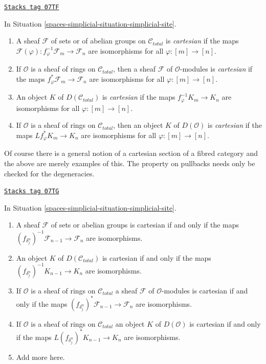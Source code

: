 \begin{definition}
\label{spaces-simplicial-definition-cartesian-sheaf}
\href{https://stacks.math.columbia.edu/tag/07TF}{\texttt{Stacks tag 07TF}}

In Situation \ref{spaces-simplicial-situation-simplicial-site}.
\begin{enumerate}
\item A sheaf $\mathcal{F}$ of sets or of abelian groups on
$\mathcal{C}_{total}$ is {\it cartesian} if the maps
$\mathcal{F}(\varphi) : f_\varphi^{-1}\mathcal{F}_m \to \mathcal{F}_n$
are isomorphisms for all $\varphi : [m] \to [n]$.
\item If $\mathcal{O}$ is a sheaf of rings on $\mathcal{C}_{total}$,
then a sheaf $\mathcal{F}$ of $\mathcal{O}$-modules is
{\it cartesian} if  the maps $f_\varphi^*\mathcal{F}_m \to \mathcal{F}_n$
are isomorphisms for all $\varphi : [m] \to [n]$.
\item An object $K$ of $D(\mathcal{C}_{total})$ is {\it cartesian} if the maps
$f_\varphi^{-1}K_m \to K_n$
are isomorphisms for all $\varphi : [m] \to [n]$.
\item If $\mathcal{O}$ is a sheaf of rings on $\mathcal{C}_{total}$, then
an object $K$ of $D(\mathcal{O})$ is {\it cartesian} if the maps
$Lf_\varphi^*K_m \to K_n$
are isomorphisms for all $\varphi : [m] \to [n]$.
\end{enumerate}
\end{definition}

Of course there is a general notion of a cartesian section of a
fibred category and the above are merely examples of this.
The property on pullbacks needs only be checked for the degeneracies.

\begin{lemma}
\label{spaces-simplicial-lemma-check-cartesian-module}
\href{https://stacks.math.columbia.edu/tag/07TG}{\texttt{Stacks tag 07TG}}

In Situation \ref{spaces-simplicial-situation-simplicial-site}.
\begin{enumerate}
\item A sheaf $\mathcal{F}$ of sets or abelian groups is cartesian
if and only if the maps
$(f_{\delta^n_j})^{-1}\mathcal{F}_{n - 1} \to \mathcal{F}_n$
are isomorphisms.
\item An object $K$ of $D(\mathcal{C}_{total})$ is cartesian
if and only if the maps
$(f_{\delta^n_j})^{-1}K_{n - 1} \to K_n$
are isomorphisms.
\item If $\mathcal{O}$ is a sheaf of rings on $\mathcal{C}_{total}$
a sheaf $\mathcal{F}$ of $\mathcal{O}$-modules is cartesian
if and only if the maps
$(f_{\delta^n_j})^*\mathcal{F}_{n - 1} \to \mathcal{F}_n$
are isomorphisms.
\item If $\mathcal{O}$ is a sheaf of rings on $\mathcal{C}_{total}$
an object $K$ of $D(\mathcal{O})$ is cartesian
if and only if the maps
$L(f_{\delta^n_j})^*K_{n - 1} \to K_n$
are isomorphisms.
\item Add more here.
\end{enumerate}
\end{lemma}

